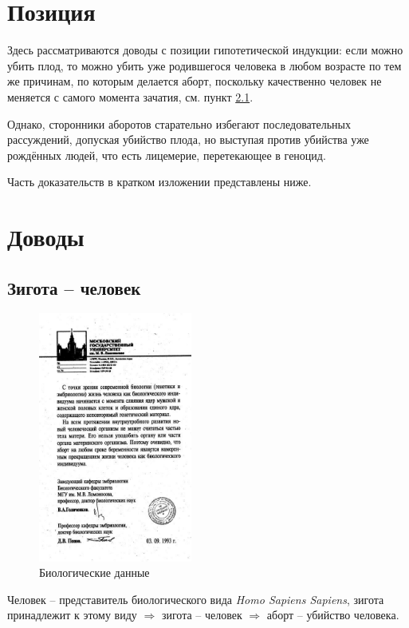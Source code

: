 \documentclass[a4paper,12pt]{report}
\begin{document}
\chapter{Позиция}
Здесь рассматриваются доводы с позиции гипотетической индукции: если можно убить плод, то можно убить 
уже родившегося человека в любом возрасте по тем же причинам, по которым делается аборт,
поскольку качественно человек не меняется с самого момента зачатия, см. пункт \ref{ishuman}.

Однако, сторонники аборотов старательно избегают последовательных рассуждений, 
допуская убийство плода, но выступая против убийства уже рождённых людей, что есть лицемерие,
перетекающее в геноцид.

Часть доказательств в кратком изложении представлены ниже. 

\chapter{Доводы}
    \section{Зигота -- человек}\label{ishuman}
        \begin{figure}[!h]
            \centering
            \includegraphics[width=0.45\textwidth]{evidence.jpg}
            \caption{Биологические данные}
        \end{figure}
     
        Человек -- представитель биологического вида \textit{Homo Sapiens Sapiens}, 
        зигота принадлежит к этому виду $\Rightarrow$ зигота -- человек $\Rightarrow$ аборт -- убийство человека.
\end{document}
